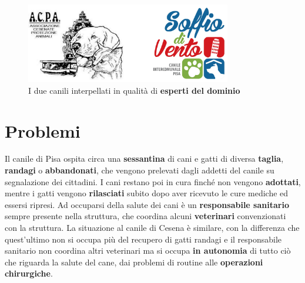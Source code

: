         \begin{figure}[H]
            \caption{I due canili interpellati in qualità di \textbf{esperti del dominio}}
            \label{fig:Canili}
            \centering
            \includegraphics[width=0.8\textwidth]{Images/canili.png}
        \end{figure}

\section{Problemi}
Il canile di Pisa ospita circa una \textbf{sessantina} di cani e gatti di diversa \textbf{taglia}, \textbf{randagi} o \textbf{abbandonati}, che vengono prelevati dagli addetti del canile su segnalazione dei cittadini. I cani restano poi in cura finché non vengono \textbf{adottati}, mentre i gatti vengono \textbf{rilasciati} subito dopo aver ricevuto le cure  mediche ed essersi ripresi. Ad occuparsi della salute dei cani è un \textbf{responsabile sanitario} sempre presente nella struttura, che coordina alcuni \textbf{veterinari} convenzionati con la struttura. La situazione al canile di Cesena è similare, con la differenza che quest'ultimo non si occupa più del recupero di gatti randagi e il responsabile sanitario non coordina altri veterinari ma si occupa \textbf{in autonomia} di tutto ciò che riguarda la salute del cane, dai problemi di routine alle \textbf{operazioni chirurgiche}.

